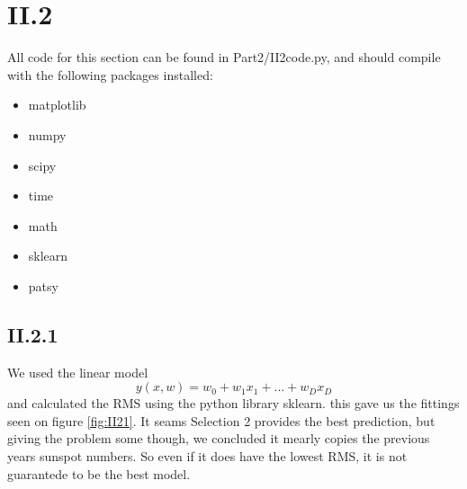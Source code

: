 \documentclass{article}
\begin{document}
\section{II.2}
All code for this section can be found in Part2/II2code.py, and should compile with the following packages installed:
\begin{itemize}
    \item matplotlib
    \item numpy
    \item scipy
    \item time
    \item math
    \item sklearn
    \item patsy
\end{itemize}

\subsection{II.2.1}

We used the linear model
\begin{equation*}
    y(x, w) = w_0 + w_1 x_1 + ... + w_D x_D
\end{equation*}
and calculated the RMS using the python library sklearn. this gave us the fittings seen on 
figure \ref{fig:II21}. It seams Selection 2 provides the best prediction, but giving the problem some though, we concluded it mearly copies
the previous years sunspot numbers. So even if it does have the lowest RMS, it is not guarantede to be the best model.
\end{document}
